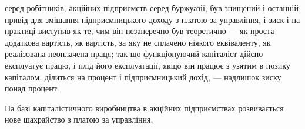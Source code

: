 серед робітників, акційних підприємств серед буржуазії,
був знищений і останній привід для змішання підприємницького
доходу з платою за управління, і зиск і на практиці
виступив як те, чим він незаперечно був теоретично — як проста
додаткова вартість, як вартість, за яку не сплачено ніякого
еквіваленту, як реалізована неоплачена праця; так що функціонуючий
капіталіст дійсно експлуатує працю, і плід його експлуатації,
якщо він працює з узятим в позику капіталом, ділиться на процент
і підприємницький дохід, — надлишок зиску понад процент.

На базі капіталістичного виробництва в акційних підприємствах
розвивається нове шахрайство з платою за управління,
\parbreak{}  %

